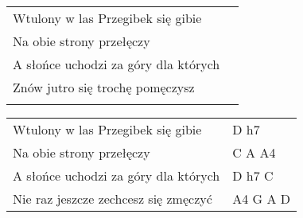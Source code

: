 \documentclass[a5paper]{article}
\begin{document}
\noindent
\begin{tabular}{@{}p{7.00cm}p{3cm}@{}}
Wtulony w las Przegibek się gibie \\
Na obie strony przełęczy \\
A słońce uchodzi za góry dla których \\
Znów jutro się trochę pomęczysz \\ \\
\end{tabular}

\noindent
\begin{tabular}{@{}p{6.00cm}p{3cm}@{}}
Wtulony w las Przegibek się gibie & D h7 \\
Na obie strony przełęczy & C A A4 \\
A słońce uchodzi za góry dla których & D h7 C \\
Nie raz jeszcze zechcesz się zmęczyć & A4 G A D
\end{tabular}
\end{document}
